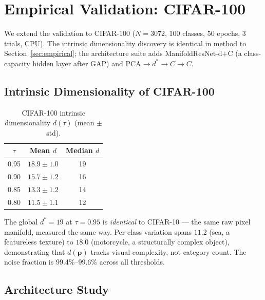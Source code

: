 \documentclass[11pt,letterpaper]{article}
\newcommand{\pos}{\mathbf{p}}
\begin{document}
\section{Empirical Validation: CIFAR-100}
\label{sec:empirical100}

We extend the validation to CIFAR-100 ($N=3072$, 100 classes, 50 epochs,
3 trials, CPU).  The intrinsic dimensionality discovery is identical in
method to Section~\ref{sec:empirical}; the architecture suite adds
ManifoldResNet-d$+$C (a class-capacity hidden layer after GAP) and
PCA$\to d^* \to C \to C$.

\subsection{Intrinsic Dimensionality of CIFAR-100}

\begin{table}[h]
\centering
\caption{CIFAR-100 intrinsic dimensionality $d(\tau)$ (mean $\pm$ std).}
\label{tab:cifar100_dim}
\begin{tabular}{@{}ccc@{}}
\toprule
$\tau$ & Mean $d$ & Median $d$ \\
\midrule
0.95 & $18.9 \pm 1.0$ & 19 \\
0.90 & $15.7 \pm 1.2$ & 16 \\
0.85 & $13.3 \pm 1.2$ & 14 \\
0.80 & $11.5 \pm 1.1$ & 12 \\
\bottomrule
\end{tabular}
\end{table}

The global $d^* = 19$ at $\tau=0.95$ is \emph{identical} to CIFAR-10 —
the same raw pixel manifold, measured the same way.  Per-class variation
spans $11.2$ (sea, a featureless texture) to $18.0$ (motorcycle, a
structurally complex object), demonstrating that $d(\pos)$ tracks visual
complexity, not category count.  The noise fraction is 99.4\%--99.6\%
across all thresholds.

\subsection{Architecture Study}
\end{document}
